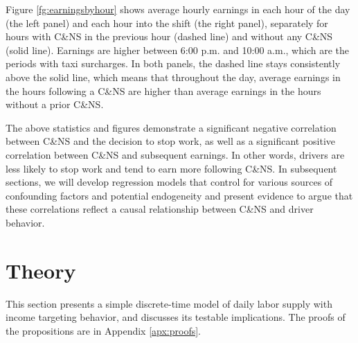\documentclass[reviewmode,AEJ]{AEA}
\begin{document}
Figure \ref{fg:earningsbyhour} shows average hourly earnings in each hour of the day (the left panel) and
each hour into the shift (the right panel), separately for hours with C\&NS in the previous hour 
(dashed line) and without any C\&NS (solid line). Earnings are higher between 6:00 p.m. and 10:00 a.m.,
which are the periods with taxi surcharges. In both panels, the dashed line stays consistently 
above the solid line, which means that throughout the day, average earnings in the hours following a 
C\&NS are higher than  average earnings in the hours without a prior C\&NS.

The above statistics and figures demonstrate a significant negative correlation between C\&NS and the 
decision to stop work, as well as a significant positive correlation between C\&NS and subsequent earnings.
In other words, drivers are less likely to stop work and tend to earn more following C\&NS. In subsequent
sections, we will develop regression models  that control for various sources of confounding factors and
potential endogeneity and present evidence to argue that these correlations reflect a causal relationship
between C\&NS and driver behavior.

\section{Theory}
\label{sec:theory}

This section presents a simple discrete-time model of daily labor supply with income targeting behavior,
and discusses its testable implications. The proofs of the propositions are in Appendix \ref{apx:proofs}.
\end{document}
